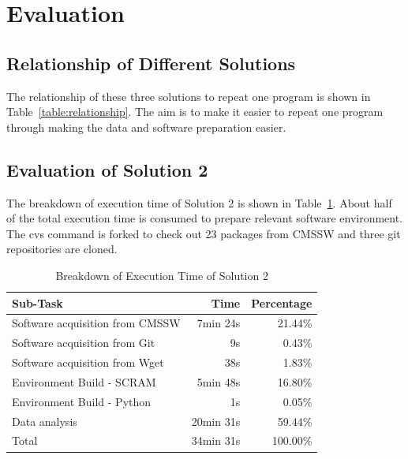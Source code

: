 \documentclass{acm_proc_article-sp}
\begin{document}


\section{Evaluation}
\subsection{Relationship of Different Solutions}
The relationship of these three solutions to repeat one program is shown in Table~\ref{table:relationship}. The aim is to make it easier to repeat one program through making the data and software preparation easier.

\subsection{Evaluation of Solution 2}
The breakdown of execution time of Solution 2 is shown in Table~\ref{table:time-2nd}. About half of the total execution time is consumed to prepare relevant software environment. The cvs command is forked to check out 23 packages from CMSSW and three git repositories are cloned.

\begin{table}
    \centering
    \begin{tabular}{|l|r|r|}
    \hline
    Sub-Task & Time & Percentage \\ \hline
    Software acquisition from CMSSW & 7min 24s & 21.44\% \\ \hline
    Software acquisition from Git & 9s & 0.43\% \\ \hline
    Software acquisition from Wget & 38s & 1.83\% \\ \hline
    Environment Build - SCRAM & 5min 48s & 16.80\% \\ \hline
    Environment Build - Python & 1s & 0.05\% \\ \hline
    Data analysis & 20min 31s & 59.44\% \\ \hline
    Total & 34min 31s & 100.00\% \\ \hline
    \end{tabular}
    \caption{Breakdown of Execution Time of Solution 2}
    \label{table:time-2nd}
\end{table}
\end{document}
